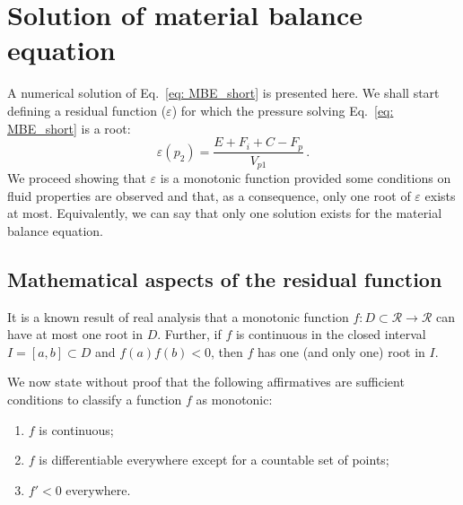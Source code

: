 \documentclass[authoryear,preprint,review,11pt]{elsarticle}
\begin{document}

\section{Solution of material balance equation}
A numerical solution of Eq.~\eqref{eq: MBE_short} is presented here. We shall start defining a residual function ($\varepsilon$) for which the pressure solving Eq.~\eqref{eq: MBE_short} is a root:
\begin{equation}\label{eq: residual}
\varepsilon(p_2) = \frac{E+F_i+C-F_p}{V_{p1}} \, .
\end{equation}
We proceed showing that $\varepsilon$ is a monotonic function provided some conditions on fluid properties are observed and that, as a consequence, only one root of $\varepsilon$ exists at most. Equivalently, we can say that only one solution exists for the material balance equation.


\subsection{Mathematical aspects of the residual function}

It is a known result of real analysis that a monotonic function $f:D\subset\mathcal{R}\rightarrow\mathcal{R}$ can have at most one root in $D$. Further, if $f$ is continuous in the closed interval $I=[a,b] \subset D$ and $f(a)f(b)<0$, then $f$ has one (and only one) root in $I$.

We now state without proof that the following affirmatives are sufficient conditions to classify a function $f$ as monotonic:
\begin{enumerate}
\item $f$ is continuous;
\item $f$ is differentiable everywhere except for a countable set of points;
\item $f'<0$ everywhere.
\end{enumerate}
\end{document}
